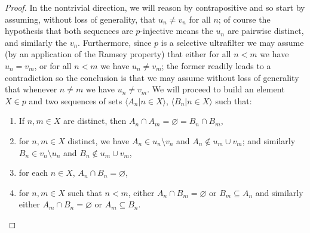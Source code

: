 \documentclass[10pt]{amsart}
\theoremstyle{definition}
\theoremstyle{remark}
\begin{document}
\begin{proof}
    In the nontrivial direction, we will reason by contrapositive and so start by assuming, without loss of generality, that $u_n\neq v_n$ for all $n$; of course the hypothesis that both sequences are $p$-injective means the $u_n$ are pairwise distinct, and similarly the $v_n$. Furthermore, since $p$ is a selective ultrafilter we may assume (by an application of the Ramsey property) that either for all $n<m$ we have $u_n=v_m$, or for all $n<m$ we have $u_n\neq v_m$; the former readily leads to a contradiction so the conclusion is that we may assume without loss of generality that whenever $n\neq m$ we have $u_n\neq v_m$. We will proceed to build an element $X\in p$ and two  sequences of sets $\langle A_n\big|n\in X\rangle$, $\langle B_n\big|n\in X\rangle$ such that:
\begin{enumerate}
 \item If $n,m\in X$ are distinct, then $A_n\cap A_m=\varnothing=B_n\cap B_m$,
 \item for $n,m\in X$ distinct, we have $A_n\in u_n\setminus v_n$ and $A_n\notin u_m\cup v_m$; and similarly $B_n\in v_n\setminus u_n$ and $B_n\notin u_m\cup v_m$,
 \item for each $n\in X$, $A_n\cap B_n=\varnothing$,
 \item for $n,m\in X$ such that $n<m$, either $A_n\cap B_m=\varnothing$ or $B_m\subseteq A_n$ and similarly either $A_m\cap B_n=\varnothing$ or $A_m\subseteq B_n$.
\end{enumerate}

\end{proof}
\end{document}
